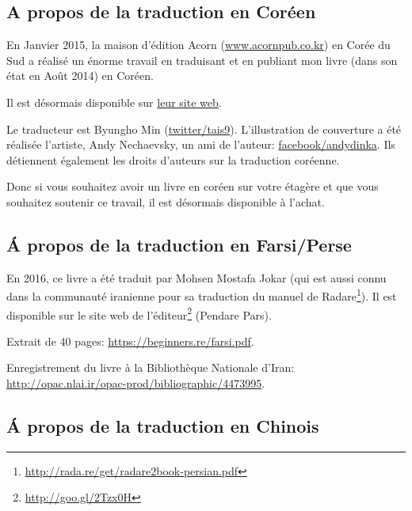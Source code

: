 



\subsection*{A propos de la traduction en Coréen}

En Janvier 2015, la maison d'édition Acorn (\href{http://www.acornpub.co.kr}{www.acornpub.co.kr}) en Corée du Sud a réalisé un énorme travail en traduisant et en publiant mon livre (dans son état en Août 2014) en Coréen.

Il est désormais disponible sur \href{http://go.yurichev.com/17343}{leur site web}.

Le traducteur est Byungho Min (\href{http://go.yurichev.com/17344}{twitter/tais9}).
L'illustration de couverture a été réalisée l'artiste, Andy Nechaevsky, un ami de l'auteur:
\href{http://go.yurichev.com/17023}{facebook/andydinka}.
Ils détiennent également les droits d'auteurs sur la traduction coréenne.

Donc si vous souhaitez avoir un livre  en coréen sur votre étagère et que vous souhaitez soutenir ce travail, il est désormais disponible à l'achat.

\subsection*{Á propos de la traduction en Farsi/Perse}

En 2016, ce livre a été traduit par Mohsen Mostafa Jokar (qui est aussi connu dans
la communauté iranienne pour sa traduction du manuel de Radare\footnote{\url{http://rada.re/get/radare2book-persian.pdf}}).
Il est disponible sur le site web de l'éditeur\footnote{\url{http://goo.gl/2Tzx0H}}
(Pendare Pars).

Extrait de 40 pages: \url{https://beginners.re/farsi.pdf}.

Enregistrement du livre à la Bibliothèque Nationale d'Iran: \url{http://opac.nlai.ir/opac-prod/bibliographic/4473995}.

\subsection*{Á propos de la traduction en Chinois}

